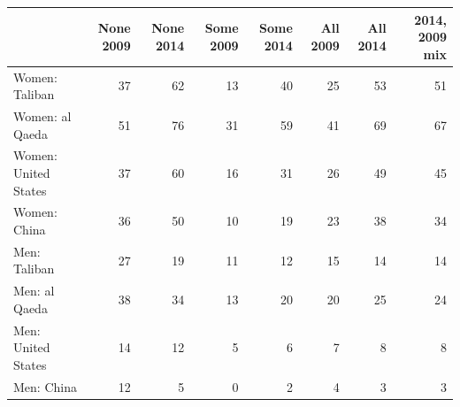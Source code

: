 \begin{tabular}{lrrrrrrr}
\toprule
 & None 2009 & None 2014 & Some 2009 & Some 2014 & All 2009 & All 2014 & 2014, 2009 mix \\
\midrule
Women: Taliban & 37 & 62 & 13 & 40 & 25 & 53 & 51 \\
Women: al Qaeda & 51 & 76 & 31 & 59 & 41 & 69 & 67 \\
Women: United States & 37 & 60 & 16 & 31 & 26 & 49 & 45 \\
Women: China & 36 & 50 & 10 & 19 & 23 & 38 & 34 \\
\midrule
Men: Taliban & 27 & 19 & 11 & 12 & 15 & 14 & 14 \\
Men: al Qaeda & 38 & 34 & 13 & 20 & 20 & 25 & 24 \\
Men: United States & 14 & 12 & 5 & 6 & 7 & 8 & 8 \\
Men: China & 12 & 5 & 0 & 2 & 4 & 3 & 3 \\
\bottomrule
\end{tabular}
